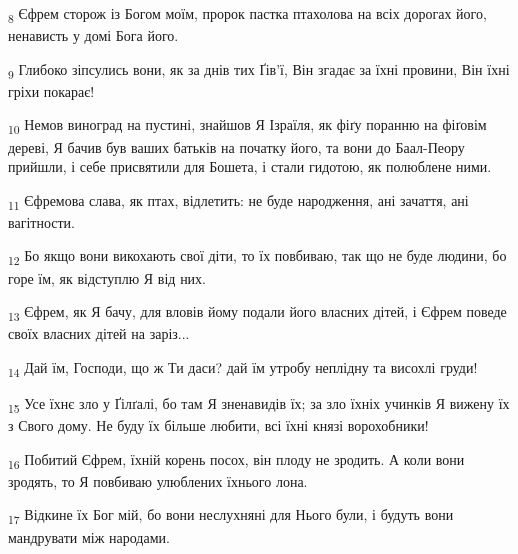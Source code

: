 \begin{tcolorbox}
\textsubscript{8} Єфрем сторож із Богом моїм, пророк пастка птахолова на всіх дорогах його, ненависть у домі Бога його.
\end{tcolorbox}
\begin{tcolorbox}
\textsubscript{9} Глибоко зіпсулись вони, як за днів тих Ґів'ї, Він згадає за їхні провини, Він їхні гріхи покарає!
\end{tcolorbox}
\begin{tcolorbox}
\textsubscript{10} Немов виноград на пустині, знайшов Я Ізраїля, як фіґу поранню на фіґовім дереві, Я бачив був ваших батьків на початку його, та вони до Баал-Пеору прийшли, і себе присвятили для Бошета, і стали гидотою, як полюблене ними.
\end{tcolorbox}
\begin{tcolorbox}
\textsubscript{11} Єфремова слава, як птах, відлетить: не буде народження, ані зачаття, ані вагітности.
\end{tcolorbox}
\begin{tcolorbox}
\textsubscript{12} Бо якщо вони викохають свої діти, то їх повбиваю, так що не буде людини, бо горе їм, як відступлю Я від них.
\end{tcolorbox}
\begin{tcolorbox}
\textsubscript{13} Єфрем, як Я бачу, для вловів йому подали його власних дітей, і Єфрем поведе своїх власних дітей на заріз...
\end{tcolorbox}
\begin{tcolorbox}
\textsubscript{14} Дай їм, Господи, що ж Ти даси? дай їм утробу неплідну та висохлі груди!
\end{tcolorbox}
\begin{tcolorbox}
\textsubscript{15} Усе їхнє зло у Ґілґалі, бо там Я зненавидів їх; за зло їхніх учинків Я вижену їх з Свого дому. Не буду їх більше любити, всі їхні князі ворохобники!
\end{tcolorbox}
\begin{tcolorbox}
\textsubscript{16} Побитий Єфрем, їхній корень посох, він плоду не зродить. А коли вони зродять, то Я повбиваю улюблених їхнього лона.
\end{tcolorbox}
\begin{tcolorbox}
\textsubscript{17} Відкине їх Бог мій, бо вони неслухняні для Нього були, і будуть вони мандрувати між народами.
\end{tcolorbox}
